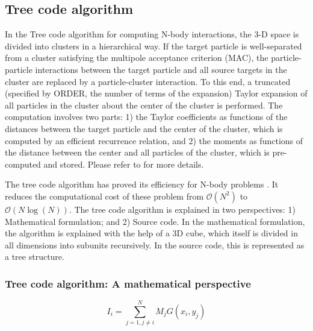 \documentclass[draftclsnofoot]{elsarticle}
\begin{document}
\subsection{Tree code algorithm}
In the Tree code algorithm for computing N-body interactions, the 3-D space is divided into clusters in a hierarchical way. If the target particle is well-separated from a cluster satisfying the multipole acceptance criterion (MAC), the particle-particle interactions between the target particle and all source targets in the cluster are replaced by a particle-cluster interaction. To this end, a truncated (specified by ORDER, the number of terms of the expansion) Taylor expansion of all particles in the cluster about the center of the cluster is performed. The computation involves two parts: 1) the Taylor coefficients as functions of the distances between the target particle and the center of the cluster, which is computed by an efficient recurrence relation, and 2) the moments as functions of the distance between the center and all particles of the cluster, which is pre-computed and stored. Please refer to \cite{krasny1} for more details.     

The tree code algorithm has proved its efficiency for N-body problems \cite{barnes}. It reduces the computational cost of these problem from $\mathcal{O}(N^2)$ to $\mathcal{O}(N\log(N))$. 
The tree code algorithm is explained in  two perspectives: 1) Mathematical formulation; and 2) Source code.  
In the mathematical formulation, the algorithm is explained with the help of 
a 3D cube, which itself is divided in all dimensions into subunits recursively. In the source code, this is represented as a tree structure. 

\subsubsection{Tree code algorithm: A mathematical perspective}
\begin{equation}
\label{eqn_inter}
I_i = \sum\limits_{j=1,j\ne i}^{N} M_jG(x_i,y_j)
\end{equation}
\end{document}
